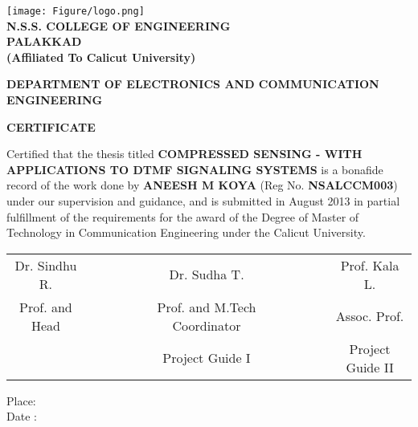 \documentclass[12pt,oneside]{mitthesis}
\begin{document}
 \thispagestyle{empty}
 
\begin{center}
\texttt{[image: Figure/logo.png]}
\\ {\Large \textbf{N.S.S. COLLEGE OF ENGINEERING\\ PALAKKAD}}
\\ \textbf{(Affiliated To Calicut University)}\vspace{0.5cm}



 \par  
{  \textbf{DEPARTMENT OF ELECTRONICS AND COMMUNICATION ENGINEERING}}


\end{center}

\begin{center}
       \vspace{1cm}
       {\Large{\bf {CERTIFICATE}}}
  \end{center}
  \par
  
 
Certified that the thesis titled \textbf{COMPRESSED SENSING - WITH APPLICATIONS TO DTMF SIGNALING SYSTEMS} is a bonafide record of the work done by \textbf{ANEESH M KOYA} (Reg No. \textbf{NSALCCM003}) under our supervision and guidance, and is submitted in August 2013 in partial fulfillment of the requirements for the award of the Degree of Master of Technology in Communication Engineering under the Calicut University.\\
\begin{center}
         \vspace{2cm}
    \end{center}
\begin{tabular}{ c l l l l c l l l l c }
Dr. Sindhu R. & & & & & Dr. Sudha T. & & & & & Prof. Kala L. \\
Prof. and Head & & & & & Prof. and M.Tech Coordinator & & & & & Assoc. Prof. \\
 & & & & & Project Guide I & & & & & Project Guide II \\
\end{tabular}

 
\vfill
\begin{flushleft}
Place:\\
Date :
\end{flushleft}
\end{document}
